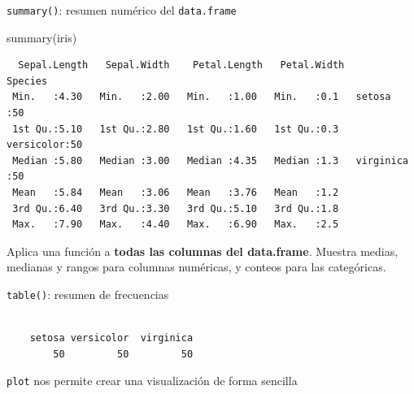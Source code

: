 \documentclass[
  letterpaper,
  DIV=11,
  numbers=noendperiod,
  twoside]{scrreprt}
\newenvironment{Shaded}{\begin{snugshade}}{\end{snugshade}}
\newcommand{\AttributeTok}[1]{\textcolor[rgb]{0.40,0.45,0.13}{#1}}
\newcommand{\DecValTok}[1]{\textcolor[rgb]{0.68,0.00,0.00}{#1}}
\newcommand{\FunctionTok}[1]{\textcolor[rgb]{0.28,0.35,0.67}{#1}}
\newcommand{\NormalTok}[1]{\textcolor[rgb]{0.00,0.23,0.31}{#1}}
\newcommand{\SpecialCharTok}[1]{\textcolor[rgb]{0.37,0.37,0.37}{#1}}
\newcommand{\StringTok}[1]{\textcolor[rgb]{0.13,0.47,0.30}{#1}}
\begin{document}
\texttt{summary()}: resumen numérico del \texttt{data.frame}

\begin{Shaded}
\begin{Highlighting}[]
\FunctionTok{summary}\NormalTok{(iris)}
\end{Highlighting}
\end{Shaded}

\begin{verbatim}
  Sepal.Length   Sepal.Width    Petal.Length   Petal.Width        Species  
 Min.   :4.30   Min.   :2.00   Min.   :1.00   Min.   :0.1   setosa    :50  
 1st Qu.:5.10   1st Qu.:2.80   1st Qu.:1.60   1st Qu.:0.3   versicolor:50  
 Median :5.80   Median :3.00   Median :4.35   Median :1.3   virginica :50  
 Mean   :5.84   Mean   :3.06   Mean   :3.76   Mean   :1.2                  
 3rd Qu.:6.40   3rd Qu.:3.30   3rd Qu.:5.10   3rd Qu.:1.8                  
 Max.   :7.90   Max.   :4.40   Max.   :6.90   Max.   :2.5                  
\end{verbatim}

Aplica una función a \textbf{todas las columnas del data.frame}. Muestra
medias, medianas y rangos para columnas numéricas, y conteos para las
categóricas.

\texttt{table()}: resumen de frecuencias

\begin{Shaded}
\end{Shaded}

\begin{verbatim}

    setosa versicolor  virginica 
        50         50         50 
\end{verbatim}

\texttt{plot} nos permite crear una visualización de forma sencilla

\begin{Shaded}
\end{Shaded}
\end{document}
